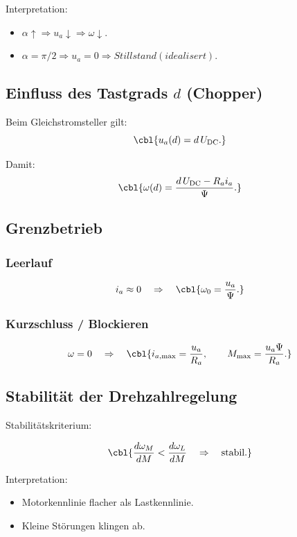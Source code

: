 Interpretation:
\begin{itemize}
    \item $\alpha \uparrow \Rightarrow u_a \downarrow \Rightarrow \omega \downarrow$.
    \item $\alpha = \pi/2 \Rightarrow u_a = 0 \Rightarrow Stillstand (idealisert)$.
\end{itemize}

\subsection{Einfluss des Tastgrads $d$ (Chopper)}

Beim Gleichstromsteller gilt:
\[
\cbl{u_a(d) = d \, U_{\mathrm{DC}}.}
\]

Damit:
\[
\cbl{\omega(d) = \frac{d\,U_{\mathrm{DC}} - R_a i_a}{\Psi}.}
\]

\subsection{Grenzbetrieb}

\subsubsection{Leerlauf}

\[
i_a \approx 0 \quad \Rightarrow \quad
\cbl{\omega_0 = \frac{u_a}{\Psi}.}
\]

\subsubsection{Kurzschluss / Blockieren}

\[
\omega = 0 \quad \Rightarrow \quad
\cbl{i_{a,\max} = \frac{u_a}{R_a}, \qquad M_{\max} = \frac{u_a \Psi}{R_a}.}
\]

\subsection{Stabilität der Drehzahlregelung}

Stabilitätskriterium:

\[
\cbl{\frac{d\omega_M}{dM} < \frac{d\omega_L}{dM}
\quad \Rightarrow \quad \text{stabil}.}
\]

Interpretation:
\begin{itemize}
    \item Motorkennlinie flacher als Lastkennlinie.
    \item Kleine Störungen klingen ab.
\end{itemize}

